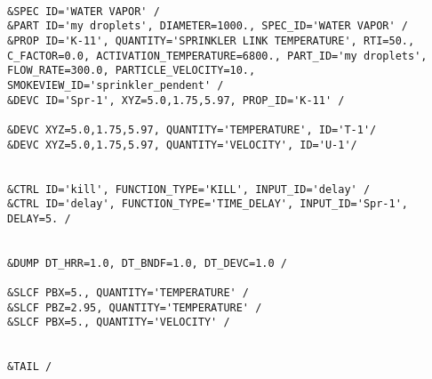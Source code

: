 \begin{lstlisting}[emptylines=0,basicstyle=\tiny]
 
&SPEC ID='WATER VAPOR' /
&PART ID='my droplets', DIAMETER=1000., SPEC_ID='WATER VAPOR' /
&PROP ID='K-11', QUANTITY='SPRINKLER LINK TEMPERATURE', RTI=50., C_FACTOR=0.0, ACTIVATION_TEMPERATURE=6800., PART_ID='my droplets', FLOW_RATE=300.0, PARTICLE_VELOCITY=10., SMOKEVIEW_ID='sprinkler_pendent' /
&DEVC ID='Spr-1', XYZ=5.0,1.75,5.97, PROP_ID='K-11' /

&DEVC XYZ=5.0,1.75,5.97, QUANTITY='TEMPERATURE', ID='T-1'/
&DEVC XYZ=5.0,1.75,5.97, QUANTITY='VELOCITY', ID='U-1'/


&CTRL ID='kill', FUNCTION_TYPE='KILL', INPUT_ID='delay' /
&CTRL ID='delay', FUNCTION_TYPE='TIME_DELAY', INPUT_ID='Spr-1', DELAY=5. /


&DUMP DT_HRR=1.0, DT_BNDF=1.0, DT_DEVC=1.0 /

&SLCF PBX=5., QUANTITY='TEMPERATURE' /
&SLCF PBZ=2.95, QUANTITY='TEMPERATURE' /
&SLCF PBX=5., QUANTITY='VELOCITY' /


&TAIL /


\end{lstlisting}

